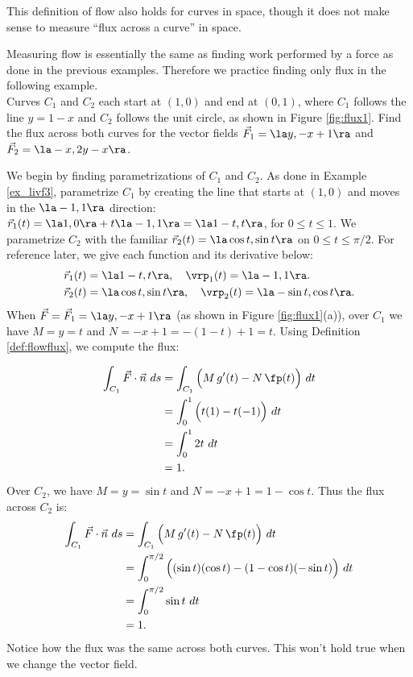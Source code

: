 This definition of flow also holds for curves in space, though it does not make sense to measure ``flux across a curve'' in space.

Measuring flow is essentially the same as finding work performed by a force as done in the previous examples. Therefore we practice finding only flux in the following example.\\

{Curves $C_1$ and $C_2$ each start at $(1,0)$ and end at $(0,1)$, where $C_1$ follows the line $y=1-x$ and $C_2$ follows the unit circle, as shown in Figure \ref{fig:flux1}. Find the flux across both curves for the vector fields $\vec F_1 = \la y, -x+1\ra$ and $\vec F_2 = \la -x, 2y-x\ra$. 
}
{%
We begin by finding parametrizations of $C_1$ and $C_2$. As done in Example \ref{ex_livf3}, parametrize $C_1$ by creating the line that starts at $(1,0)$ and moves in the $\la -1,1\ra$ direction: $\vec r_1(t) = \la 1,0\ra + t\la -1,1\ra = \la 1-t, t\ra$, for $0\leq t\leq 1$. We parametrize $C_2$ with the familiar $\vec r_2(t) = \la \cos t,\sin t\ra$ on $0\leq t\leq \pi/2$. For reference later, we give each function and its derivative below:
\begin{align*}
 \vec r_1(t) &= \la 1-t, t\ra, \quad \vrp_1(t) = \la -1,1\ra.\\
\vec r_2(t) &= \la \cos t, \sin t\ra, \quad \vrp_2(t) = \la -\sin t ,\cos t\ra.
\end{align*}
When $\vec F = \vec F_1 = \la y, -x+1\ra$ (as shown in Figure \ref{fig:flux1}(a)), over $C_1$ we have $M = y =t$ and $N = -x+1 = -(1-t)+1 = t$. Using Definition \ref{def:flowflux}, we compute the flux:

\begin{align*}
\int_{C_1} \vec F\cdot \vec n\ ds & = \int_{C_1} \Big(M\,g'(t) - N\,\fp(t)\Big)\ dt\\
			&= \int_0^1 \Big( t(1) - t(-1)\Big)\ dt \\
			&= \int_0^1 2t\ dt\\
			&= 1.
\end{align*}
Over $C_2$, we have $M = y = \sin t$ and $N = -x+1 = 1-\cos t$. Thus the flux across $C_2$ is:
\begin{align*}
\int_{C_1} \vec F\cdot \vec n\ ds & = \int_{C_1} \Big(M\,g'(t) - N\,\fp(t)\Big)\ dt\\
				&= \int_0^{\pi/2}\Big((\sin t)(\cos t) - (1-\cos t)(-\sin t)\Big)\ dt\\
				&= \int_0^{\pi/2} \sin t\ dt\\
				&=1.
\end{align*}
Notice how the flux was the same across both curves. This won't hold true when we change the vector field.
\drawexampleline%

}
